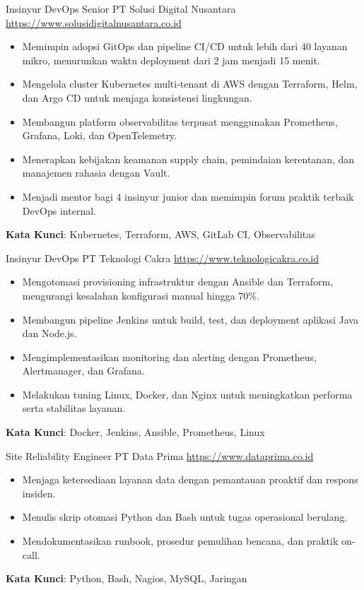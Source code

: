 \documentclass[a4paper, serif, 10pt]{moderncv}
\begin{document}
        {Insinyur DevOps Senior}
        {PT Solusi Digital Nusantara}
        {\url{https://www.solusidigitalnusantara.co.id}}
        {}
        {\begin{itemize}
\item Memimpin adopsi GitOps dan pipeline CI/CD untuk lebih dari 40 layanan mikro, menurunkan waktu deployment dari 2 jam menjadi 15 menit.
\item Mengelola cluster Kubernetes multi-tenant di AWS dengan Terraform, Helm, dan Argo CD untuk menjaga konsistensi lingkungan.
\item Membangun platform observabilitas terpusat menggunakan Prometheus, Grafana, Loki, dan OpenTelemetry.
\item Menerapkan kebijakan keamanan supply chain, pemindaian kerentanan, dan manajemen rahasia dengan Vault.
\item Menjadi mentor bagi 4 insinyur junior dan memimpin forum praktik terbaik DevOps internal.
\end{itemize}
\textbf{Kata Kunci}: Kubernetes, Terraform, AWS, GitLab CI, Observabilitas}

        {Insinyur DevOps}
        {PT Teknologi Cakra}
        {\url{https://www.teknologicakra.co.id}}
        {}
        {\begin{itemize}
\item Mengotomasi provisioning infrastruktur dengan Ansible dan Terraform, mengurangi kesalahan konfigurasi manual hingga 70\%.
\item Membangun pipeline Jenkins untuk build, test, dan deployment aplikasi Java dan Node.js.
\item Mengimplementasikan monitoring dan alerting dengan Prometheus, Alertmanager, dan Grafana.
\item Melakukan tuning Linux, Docker, dan Nginx untuk meningkatkan performa serta stabilitas layanan.
\end{itemize}
\textbf{Kata Kunci}: Docker, Jenkins, Ansible, Prometheus, Linux}

        {Site Reliability Engineer}
        {PT Data Prima}
        {\url{https://www.dataprima.co.id}}
        {}
        {\begin{itemize}
\item Menjaga ketersediaan layanan data dengan pemantauan proaktif dan respons insiden.
\item Menulis skrip otomasi Python dan Bash untuk tugas operasional berulang.
\item Mendokumentasikan runbook, prosedur pemulihan bencana, dan praktik on-call.
\end{itemize}
\textbf{Kata Kunci}: Python, Bash, Nagios, MySQL, Jaringan}
\end{document}
